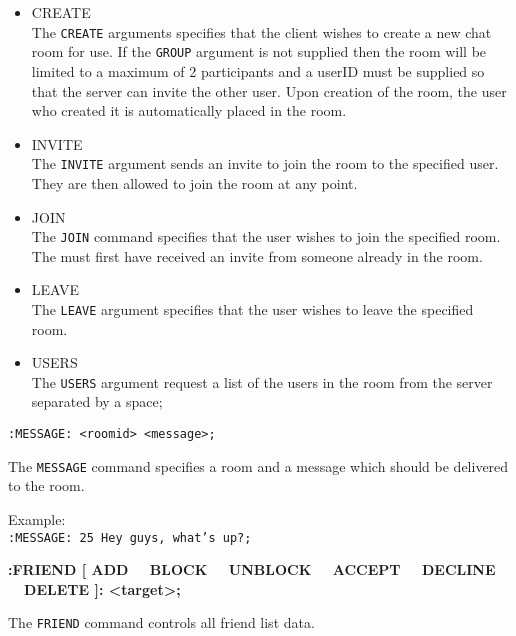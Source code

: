\begin{itemize}

\item{CREATE \\
The \texttt{CREATE} arguments specifies that the client wishes to create a new chat room for use. If the \texttt{GROUP} argument is not supplied then the room will be limited to a maximum of 2 participants and a userID must be supplied so that the server can invite the other user. Upon creation of the room, the user who created it is automatically placed in the room.}

\item {INVITE \\
The \texttt{INVITE} argument sends an invite to join the room to the specified user. They are then allowed to join the room at any point.}

\item{JOIN \\
The \texttt{JOIN} command specifies that the user wishes to join the specified room. The must first have received an invite from someone already in the room.}

\item{LEAVE \\
The \texttt{LEAVE} argument specifies that the user wishes to leave the specified room.}

\item{USERS \\
The \texttt{USERS} argument request a list of the users in the room from the server separated by a space;}

\end{itemize}

\texttt{:MESSAGE: <roomid> <message>;}

The \texttt{MESSAGE} command specifies a room and a message which should be delivered to the room.

Example: \\
\texttt{:MESSAGE: 25 Hey guys, what’s up?;}

{\bf :FRIEND [ ADD \ \vline \ BLOCK \ \vline \ UNBLOCK \ \vline \ ACCEPT \ \vline \ DECLINE \ \vline \ DELETE ]: <target>;}

The \texttt{FRIEND} command controls all friend list data.

